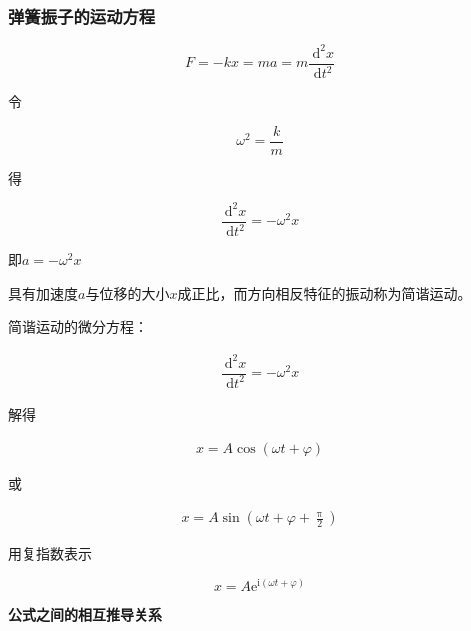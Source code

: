 \documentclass[12pt, a4paper]{article}
\numberwithin{equation}{section}
\newcommand{\rmd}{\mathrm{~d}}
\begin{document}
\subsubsection{弹簧振子的运动方程}

    \begin{equation}
        F=-k x=m a=m \frac{\rmd^2 x}{\rmd t^2}
    \end{equation}

    令
    
    \[
        \omega^2=\frac{k}{m}
    \]
    
    得
    
    \[
        \dfrac{\rmd^2 x}{\rmd t^2} = -\omega^2 x
    \]

    即\(a=-\omega^2 x\)

    具有加速度\(a\)与位移的大小\(x\)成正比，而方向相反特征的振动称为简谐运动。

    简谐运动的微分方程：

    \begin{align}
        \dfrac{\rmd^2 x}{\rmd t^2} = -\omega^2 x
    \end{align}

    解得

    \begin{align}
        x = A \cos\left(\omega t + \varphi\right)
    \end{align}

    或

    \begin{align}
        x = A \sin\left(\omega t + \varphi + \frac{\uppi}{2}\right)
    \end{align}

    用复指数表示
    
    \begin{equation}
        x=A \mathrm{e}^{\mathrm{i}(\omega t+\varphi)}
    \end{equation}

    \textbf{公式之间的相互推导关系}
\end{document}
